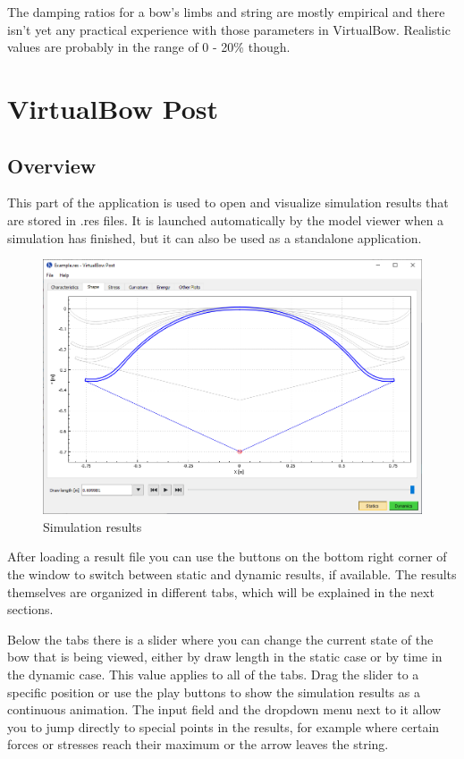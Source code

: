 \documentclass[12pt]{article}
\begin{document}
The damping ratios for a bow's limbs and string are mostly empirical and there isn't yet any practical experience with those parameters in VirtualBow.
Realistic values are probably in the range of 0 - 20\% though.



\newpage
\section{VirtualBow Post}

\subsection{Overview}

This part of the application is used to open and visualize simulation results that are stored in .res files.
It is launched automatically by the model viewer when a simulation has finished, but it can also be used as a standalone application.
\bigskip

\begin{figure}[H]
\centering
\includegraphics[width=\textwidth]{figures/screenshots/output/result-window}
\caption{Simulation results}
\label{fig:result-window}
\end{figure}

After loading a result file you can use the buttons on the bottom right corner of the window to switch between static and dynamic results, if available.
The results themselves are organized in different tabs, which will be explained in the next sections.

Below the tabs there is a slider where you can change the current state of the bow that is being viewed, either by draw length in the static case or by time in the dynamic case.
This value applies to all of the tabs.
Drag the slider to a specific position or use the play buttons to show the simulation results as a continuous animation.
The input field and the dropdown menu next to it allow you to jump directly to special points in the results, for example where certain forces or stresses reach their maximum or the arrow leaves the string. 
\end{document}
